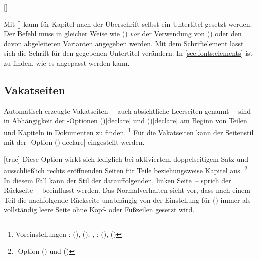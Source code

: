 \begin{Declaration*}{}
\begin{Declaration*}{}
\begin{Declaration*}{}
\begin{Declaration}[v2.06]{[]}
\begin{Declaration}[v2.06]{}
\printdeclarationlist%
%
%
%
%
Mit [] kann für Kapitel nach 
der Überschrift selbst ein Untertitel gesetzt werden. Der Befehl muss in 
gleicher Weise wie () 
\emph{vor} der Verwendung von () oder 
den davon abgeleiteten Varianten angegeben werden. Mit dem Schriftelement 
 lässt sich die Schrift für den gegebenen Untertitel 
verändern. In \autoref{sec:fonts:elements} ist zu finden, wie es angepasst 
werden kann.
\end{Declaration}
\end{Declaration}


\subsection{Vakatseiten}
%
%
Automatisch erzeugte Vakatseiten~-- auch absichtliche Leerseiten genannt~-- 
sind in Abhängigkeit der 
\KOMAScript-Optionen ()|declare| 
und ()|declare| am Beginn von Teilen 
und Kapiteln in Dokumenten zu finden.%
\footnote{%
  Voreinstellungen
  : 
  (), 
  ();
  , : 
  (), 
  ()%
}
Für die Vakatseiten kann der Seitenstil mit der \KOMAScript-Option 
()|declare| eingestellt 
werden.

\begin{Declaration}{}[true]%
\printdeclarationlist%
%
%
%
%
%
%
Diese Option wirkt sich lediglich bei aktiviertem doppelseitigem Satz und 
ausschließlich rechts eröffnenden Seiten für Teile beziehungsweise Kapitel
aus.%
\footnote{%
  \KOMAScript-Option () und 
  ()%
}
In diesem Fall kann der Stil der darauffolgenden, linken Seite~-- sprich der 
Rückseite~-- beeinflusst werden. Das Normalverhalten sieht vor, dass nach einem 
Teil die nachfolgende Rückseite unabhängig von der Einstellung für 
() immer als vollständig leere 
Seite ohne Kopf- oder Fußzeilen gesetzt wird.


\end{Declaration}
\end{Declaration*}
\end{Declaration*}
\end{Declaration*}
